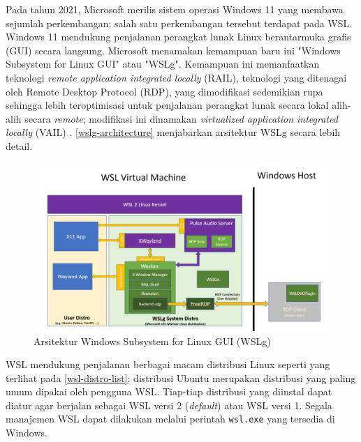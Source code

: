 
Pada tahun 2021, Microsoft merilis sistem operasi Windows 11 yang membawa sejumlah perkembangan; salah satu perkembangan tersebut terdapat pada WSL. Windows 11 mendukung penjalanan perangkat lunak Linux berantarmuka grafis (GUI) secara langsung. Microsoft menamakan kemampuan baru ini "Windows Subsystem for Linux GUI" atau "WSLg". Kemampuan ini memanfaatkan teknologi \textit{remote application integrated locally} (RAIL), teknologi yang ditenagai oleh Remote Desktop Protocol (RDP), yang dimodifikasi sedemikian rupa sehingga lebih teroptimisasi untuk penjalanan perangkat lunak secara lokal alih-alih secara \textit{remote}; modifikasi ini dinamakan \textit{virtualized application integrated locally} (VAIL) \cite{microsoft-devblogs-wslg-architecture}. \autoref{wslg-architecture} menjabarkan arsitektur WSLg secara lebih detail.

\begin{figure}
    \centering
    \includegraphics[width=1\linewidth]{assets/wslg-architecture.png}
    \caption{Arsitektur Windows Subsystem for Linux GUI (WSLg) \cite{microsoft-devblogs-wslg-architecture}}
    \label{wslg-architecture}
\end{figure}


WSL mendukung penjalanan berbagai macam distribusi Linux seperti yang terlihat pada \autoref{wsl-distro-list}; distribusi Ubuntu merupakan distribusi yang paling umum dipakai oleh pengguna WSL. Tiap-tiap distribusi yang diinstal dapat diatur agar berjalan sebagai WSL versi 2 (\textit{default}) atau WSL versi 1. Segala manajemen WSL dapat dilakukan melalui perintah \verb|wsl.exe| yang tersedia di Windows.


